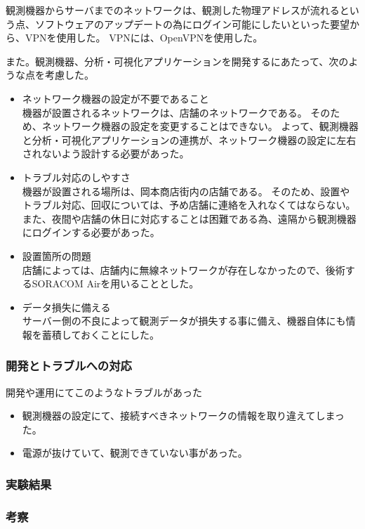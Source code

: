 観測機器からサーバまでのネットワークは、観測した物理アドレスが流れるという点、ソフトウェアのアップデートの為にログイン可能にしたいといった要望から、VPNを使用した。
VPNには、OpenVPNを使用した。

また。観測機器、分析・可視化アプリケーションを開発するにあたって、次のような点を考慮した。
\begin{itemize}
\item ネットワーク機器の設定が不要であること\\
	機器が設置されるネットワークは、店舗のネットワークである。
	そのため、ネットワーク機器の設定を変更することはできない。
	よって、観測機器と分析・可視化アプリケーションの連携が、ネットワーク機器の設定に左右されないよう設計する必要があった。
\item トラブル対応のしやすさ\\
	機器が設置される場所は、岡本商店街内の店舗である。
	そのため、設置やトラブル対応、回収については、予め店舗に連絡を入れなくてはならない。
	また、夜間や店舗の休日に対応することは困難である為、遠隔から観測機器にログインする必要があった。
\item 設置箇所の問題\\
	店舗によっては、店舗内に無線ネットワークが存在しなかったので、後術するSORACOM Airを用いることとした。
\item データ損失に備える\\
	サーバー側の不良によって観測データが損失する事に備え、機器自体にも情報を蓄積しておくことにした。
\end{itemize}

\subsubsection{開発とトラブルへの対応}
開発や運用にてこのようなトラブルがあった
\begin{itemize}
\item 観測機器の設定にて、接続すべきネットワークの情報を取り違えてしまった。
\item 電源が抜けていて、観測できていない事があった。
\end{itemize}


\subsubsection{実験結果}

\subsubsection{考察}













